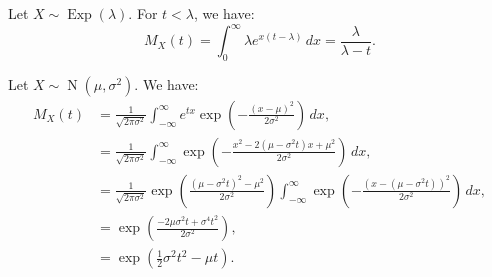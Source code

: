 \documentclass{huhtakm-template-book-v2}
\DeclareMathOperator{\Exp}{Exp}
\DeclareMathOperator{\N}{N}
\begin{document}
    \begin{eg}
        Let $X \sim \Exp(\lambda)$. For $t < \lambda$, we have:
        \begin{equation*}
            M_{X}(t) = \int_{0}^{\infty}\lambda e^{x(t-\lambda)}\,dx = \frac{\lambda}{\lambda-t}.
        \end{equation*}
    \end{eg}
    \begin{eg}
        Let $X \sim \N(\mu,\sigma^{2})$. We have:
        \begin{align*}
            M_{X}(t) &= \frac{1}{\sqrt{2\pi\sigma^{2}}}\int_{-\infty}^{\infty}e^{tx}\exp\left(-\frac{(x-\mu)^{2}}{2\sigma^{2}}\right)\,dx,\\
            &= \frac{1}{\sqrt{2\pi\sigma^{2}}}\int_{-\infty}^{\infty}\exp\left(-\frac{x^{2}-2(\mu-\sigma^{2}t)x+\mu^{2}}{2\sigma^{2}}\right)\,dx,\\
            &= \frac{1}{\sqrt{2\pi\sigma^{2}}}\exp\left(\frac{(\mu-\sigma^{2}t)^{2}-\mu^{2}}{2\sigma^{2}}\right)\int_{-\infty}^{\infty}\exp\left(-\frac{(x-(\mu-\sigma^{2}t))^{2}}{2\sigma^{2}}\right)\,dx,\\
            &= \exp\left(\frac{-2\mu\sigma^{2}t+\sigma^{4}t^{2}}{2\sigma^{2}}\right),\\
            &= \exp\left(\frac{1}{2}\sigma^{2}t^{2}-\mu t\right).
        \end{align*}	
    \end{eg}
    \newpage
\end{document}
